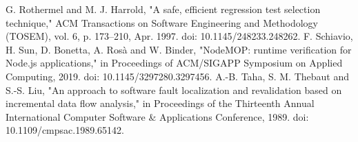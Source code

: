 \documentclass[10pt, conference]{IEEEtran}
\begin{document}
\begin{thebibliography}{00}
 G. Rothermel and M. J. Harrold, "A safe, efficient regression test selection technique," ACM Transactions on Software Engineering and Methodology (TOSEM), vol. 6, p. 173–210, Apr. 1997. doi: 10.1145/248233.248262.
 F. Schiavio, H. Sun, D. Bonetta, A. Rosà and W. Binder, "NodeMOP: runtime verification for Node.js applications," in Proceedings of ACM/SIGAPP Symposium on Applied Computing, 2019. doi: 10.1145/3297280.3297456.
 A.-B. Taha, S. M. Thebaut and S.-S. Liu, "An approach to software fault localization and revalidation based on incremental data flow analysis," in Proceedings of the Thirteenth Annual International Computer Software \& Applications Conference, 1989. doi: 10.1109/cmpsac.1989.65142.
\end{thebibliography}
\vspace{12pt}
\end{document}
